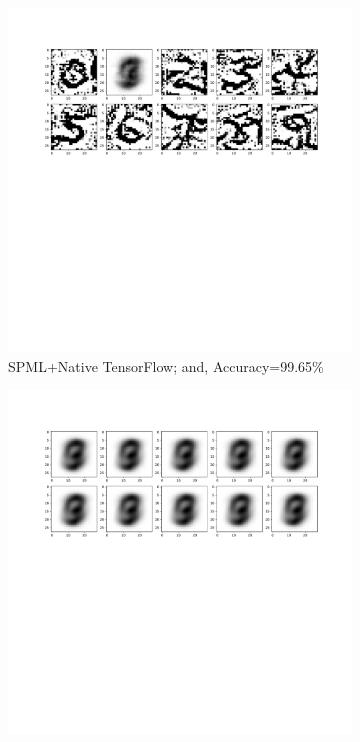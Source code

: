 \begin{figure}
\begin{subfigure}{.325\textwidth}
         \includegraphics[width=\textwidth]{images/Hw_attack/Mnistattack_native.pdf}
         \vspace{-8em}
         \caption{SPML+Native TensorFlow; and, Accuracy=99.65\%}
         \label{fig:hwEps0}
     \end{subfigure}
     \begin{subfigure}{.325\textwidth}
         \includegraphics[width=\textwidth]{images/Hw_attack/Mnistattack.2.pdf}

\end{subfigure}
\end{figure}

